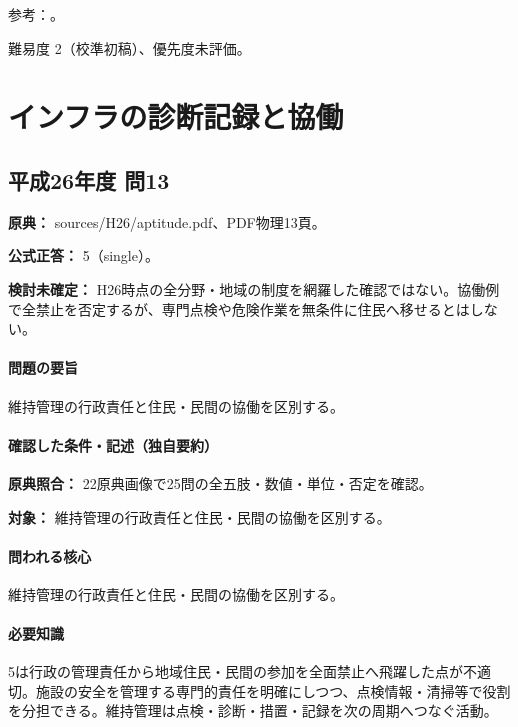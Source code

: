 \par 参考：\cite{env_ar5,env_rain2017,env_evac2021,env_warning2026}。

\par 難易度 2（校準初稿）、優先度未評価。

\section{インフラの診断記録と協働}

\subsection{平成26年度 問13}
\label{q:h26-reg-apt-13}

\noindent\textbf{原典：} sources/H26/aptitude.pdf、PDF物理13頁。

\textbf{公式正答：} 5（single）。

\par\textbf{検討未確定：} H26時点の全分野・地域の制度を網羅した確認ではない。協働例で全禁止を否定するが、専門点検や危険作業を無条件に住民へ移せるとはしない。

\paragraph{問題の要旨} 維持管理の行政責任と住民・民間の協働を区別する。

\paragraph{確認した条件・記述（独自要約）}\mbox{}\par

\noindent\textbf{原典照合：} 22原典画像で25問の全五肢・数値・単位・否定を確認。\par

\noindent\textbf{対象：} 維持管理の行政責任と住民・民間の協働を区別する。\par

\paragraph{問われる核心} 維持管理の行政責任と住民・民間の協働を区別する。

\paragraph{必要知識} 5は行政の管理責任から地域住民・民間の参加を全面禁止へ飛躍した点が不適切。施設の安全を管理する専門的責任を明確にしつつ、点検情報・清掃等で役割を分担できる。維持管理は点検・診断・措置・記録を次の周期へつなぐ活動。


